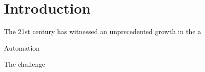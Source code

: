 \chapter{Introduction}

The 21st century has witnessed an unprecedented growth in the a

Automation

The challenge

\citep{barachant2013riemannian}